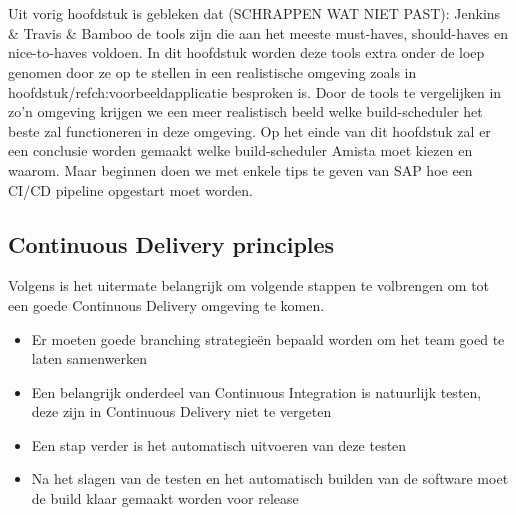 
\chapter{}
\label{ch:proof-of-concept}
Uit vorig hoofdstuk is gebleken dat (SCHRAPPEN WAT NIET PAST): Jenkins \& Travis \& Bamboo de tools zijn die aan het meeste must-haves, should-haves en nice-to-haves voldoen. In dit hoofdstuk worden deze tools extra onder de loep genomen door ze op te stellen in een realistische omgeving zoals in hoofdstuk/ref{ch:voorbeeldapplicatie} besproken is. Door de tools te vergelijken in zo'n omgeving krijgen we een meer realistisch beeld welke build-scheduler het beste zal functioneren in deze omgeving. Op het einde van dit hoofdstuk zal er een conclusie worden gemaakt welke build-scheduler Amista moet kiezen en waarom. Maar beginnen doen we met enkele tips te geven van SAP hoe een CI/CD pipeline opgestart moet worden.

\section{Continuous Delivery principles}
\label{sec:continuous-delivery-principles}
Volgens \textcite{Riti2018} is het uitermate belangrijk om volgende stappen te volbrengen om tot een goede Continuous Delivery omgeving te komen.
\begin{itemize}
    \item Er moeten goede branching strategieën bepaald worden om het team goed te laten samenwerken
    \item Een belangrijk onderdeel van Continuous Integration is natuurlijk testen, deze zijn in Continuous Delivery niet te vergeten
    \item Een stap verder is het automatisch uitvoeren van deze testen
    \item Na het slagen van de testen en het automatisch builden van de software moet de build klaar gemaakt worden voor release
\end{itemize}

